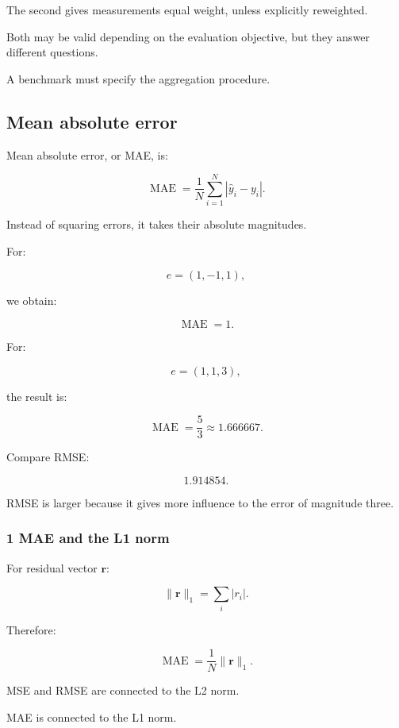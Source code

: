 The second gives measurements equal weight, unless explicitly reweighted.

Both may be valid depending on the evaluation objective, but they answer different questions.

A benchmark must specify the aggregation procedure.

\subsection{Mean absolute error}\label{02-foundations-ii-ch030-mean-absolute-error}

\hypertarget{02-foundations-ii-ch030-mean-absolute-error}{}

Mean absolute error, or MAE, is:

\[
 \boxed{ \operatorname{MAE} = \frac1N\sum_{i=1}^{N} |\hat y_i-y_i| }.
\]

Instead of squaring errors, it takes their absolute magnitudes.

For:

\[
 e=(1,-1,1),
\]

we obtain:

\[
 \boxed{\operatorname{MAE}=1}.
\]

For:

\[
 e=(1,1,3),
\]

the result is:

\[
 \boxed{ \operatorname{MAE}=\frac53\approx1.666667 }.
\]

Compare RMSE:

\[
 1.914854.
\]

RMSE is larger because it gives more influence to the error of magnitude three.

\subsubsection{1 MAE and the L1 norm}\label{02-foundations-ii-ch030-mae-and-the-l1-norm}

\hypertarget{02-foundations-ii-ch030-mae-and-the-l1-norm}{}

For residual vector \(\mathbf r\):

\[
 \|\mathbf r\|_1=\sum_i|r_i|.
\]

Therefore:

\[
 \boxed{ \operatorname{MAE}= \frac1N\|\mathbf r\|_1 }.
\]

MSE and RMSE are connected to the L2 norm.

MAE is connected to the L1 norm.

